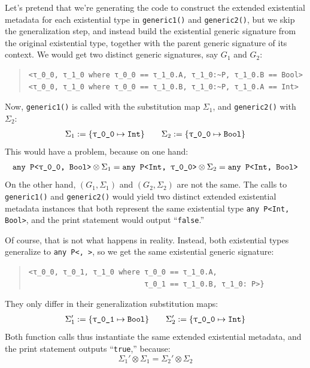 \documentclass[../generics]{subfiles}
\begin{document}
Let's pretend that we're generating the code to construct the extended existential metadata for each existential type in \texttt{generic1()} and \texttt{generic2()}, but we skip the generalization step, and instead build the existential generic signature from the original existential type, together with the parent generic signature of its context. We would get two distinct generic signatures, say $G_1$ and $G_2$:
\begin{quote}
\begin{verbatim}
<τ_0_0, τ_1_0 where τ_0_0 == τ_1_0.A, τ_1_0:~P, τ_1_0.B == Bool>
<τ_0_0, τ_1_0 where τ_0_0 == τ_1_0.B, τ_1_0:~P, τ_1_0.A == Int>
\end{verbatim}
\end{quote}
Now, \texttt{generic1()} is called with the substitution map $\Sigma_1$, and \texttt{generic2()} with $\Sigma_2$:
\begin{gather*}
\Sigma_1 := \SubstMap{\SubstType{\rT}{Int}} \qquad
\Sigma_2 := \SubstMap{\SubstType{\rT}{Bool}}
\end{gather*}
This would have a problem, because on one hand:
\[
\texttt{any P<\rT, Bool>} \otimes \Sigma_1 = \texttt{any P<Int, \rT>} \otimes \Sigma_2 = \texttt{any P<Int, Bool>}
\]
On the other hand, $(G_1, \Sigma_1)$ and $(G_2, \Sigma_2)$ are not the same. The calls to \texttt{generic1()} and \texttt{generic2()} would yield two distinct extended existential metadata instances that both represent the same existential type \texttt{any P<Int, Bool>}, and the print statement would output ``\texttt{false}.''

Of course, that is not what happens in reality. Instead, both existential types generalize to \texttt{any~P<\rT, \rU>}, so we get the same existential generic signature:
\begin{quote}
\begin{verbatim}
<τ_0_0, τ_0_1, τ_1_0 where τ_0_0 == τ_1_0.A,
                           τ_0_1 == τ_1_0.B, τ_1_0: P>}
\end{verbatim}
\end{quote}
They only differ in their generalization substitution maps:
\begin{gather*}
\Sigma_1' := \SubstMap{\SubstType{\rU}{Bool}} \qquad
\Sigma_2' := \SubstMap{\SubstType{\rT}{Int}}
\end{gather*}
Both function calls thus instantiate the same extended existential metadata, and the print statement outputs ``\texttt{true},'' because:
\[
\Sigma_1' \otimes \Sigma_1 = \Sigma_2' \otimes \Sigma_2
\]
\end{document}
